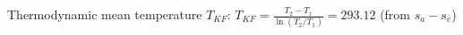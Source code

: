 Thermodynamic mean temperature \( T_{KF} \):  
\( T_{KF} = \frac{T_2 - T_1}{\ln(T_2 / T_1)} = 293.12 \)  
(from \( s_a - s_e \))